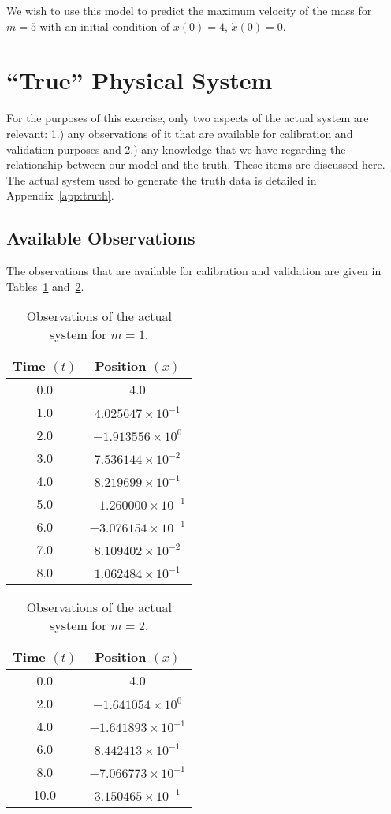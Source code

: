 \documentclass[11pt]{article}
\begin{document}
We wish to use this model to predict the maximum velocity of the mass
for $m=5$ with an initial condition of $x(0) = 4$, $\dot{x}(0) = 0$.


\section{``True'' Physical System}
\label{sec:true_phys_sys}
For the purposes of this exercise, only two aspects of the actual
system are relevant: 1.) any observations of it that are available for
calibration and validation purposes and 2.) any knowledge that we
have regarding the relationship between our model and the truth.
These items are discussed here.  The actual system used to generate
the truth data is detailed in Appendix~\ref{app:truth}.

\subsection{Available Observations}
The observations that are available for calibration and validation are
given in Tables~\ref{tbl:data_m1} and~\ref{tbl:data_m2}.
%
\begin{table}[ht]
\caption{Observations of the actual system for $m=1$.}
\begin{center}
\begin{tabular}{|c|c|}
\hline
Time $(t)$ & Position $(x)$ \\
\hline
0.0 & 4.0 \\
1.0 & $4.025647 \times 10^{-1}$ \\
2.0 & $-1.913556 \times 10^0$ \\
3.0 & $7.536144 \times 10^{-2}$ \\
4.0 & $8.219699 \times 10^{-1}$ \\
5.0 & $-1.260000 \times 10^{-1}$ \\
6.0 & $-3.076154 \times 10^{-1}$ \\
7.0 & $8.109402 \times 10^{-2}$ \\
8.0 & $1.062484 \times 10^{-1}$ \\
\hline
\end{tabular}
\end{center}
\label{tbl:data_m1}
\end{table}
%
%
\begin{table}[ht]
\caption{Observations of the actual system for $m=2$.}
\begin{center}
\begin{tabular}{|c|c|}
\hline
Time $(t)$ & Position $(x)$ \\
\hline
0.0 & 4.0 \\
2.0 & $-1.641054 \times 10^0$ \\
4.0 & $-1.641893 \times 10^{-1}$ \\
6.0 & $8.442413 \times 10^{-1}$ \\
8.0 & $-7.066773 \times 10^{-1}$ \\
10.0 & $3.150465 \times 10^{-1}$ \\
\hline
\end{tabular}
\end{center}
\label{tbl:data_m2}
\end{table}
\end{document}

